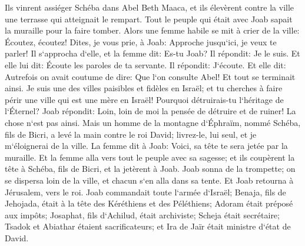 \verse Ils vinrent assiéger Schéba dans Abel Beth Maaca, et ils élevèrent contre la ville une terrasse qui atteignait le rempart. Tout le peuple qui était avec Joab sapait la muraille pour la faire tomber. 
\verse Alors une femme habile se mit à crier de la ville: Écoutez, écoutez! Dites, je vous prie, à Joab: Approche jusqu`ici, je veux te parler! 
\verse Il s`approcha d`elle, et la femme dit: Es-tu Joab? Il répondit: Je le suis. Et elle lui dit: Écoute les paroles de ta servante. Il répondit: J`écoute. 
\verse Et elle dit: Autrefois on avait coutume de dire: Que l`on consulte Abel! Et tout se terminait ainsi. 
\verse Je suis une des villes paisibles et fidèles en Israël; et tu cherches à faire périr une ville qui est une mère en Israël! Pourquoi détruirais-tu l`héritage de l`Éternel? 
\verse Joab répondit: Loin, loin de moi la pensée de détruire et de ruiner! 
\verse La chose n`est pas ainsi. Mais un homme de la montagne d`Éphraïm, nommé Schéba, fils de Bicri, a levé la main contre le roi David; livrez-le, lui seul, et je m`éloignerai de la ville. La femme dit à Joab: Voici, sa tête te sera jetée par la muraille. 
\verse Et la femme alla vers tout le peuple avec sa sagesse; et ils coupèrent la tête à Schéba, fils de Bicri, et la jetèrent à Joab. Joab sonna de la trompette; on se dispersa loin de la ville, et chacun s`en alla dans sa tente. Et Joab retourna à Jérusalem, vers le roi. 
\verse Joab commandait toute l`armée d`Israël; Benaja, fils de Jehojada, était à la tête des Kéréthiens et des Péléthiens; 
\verse Adoram était préposé aux impôts; Josaphat, fils d`Achilud, était archiviste; 
\verse Scheja était secrétaire; Tsadok et Abiathar étaient sacrificateurs; 
\verse et Ira de Jaïr était ministre d`état de David. 

\chapter{}

